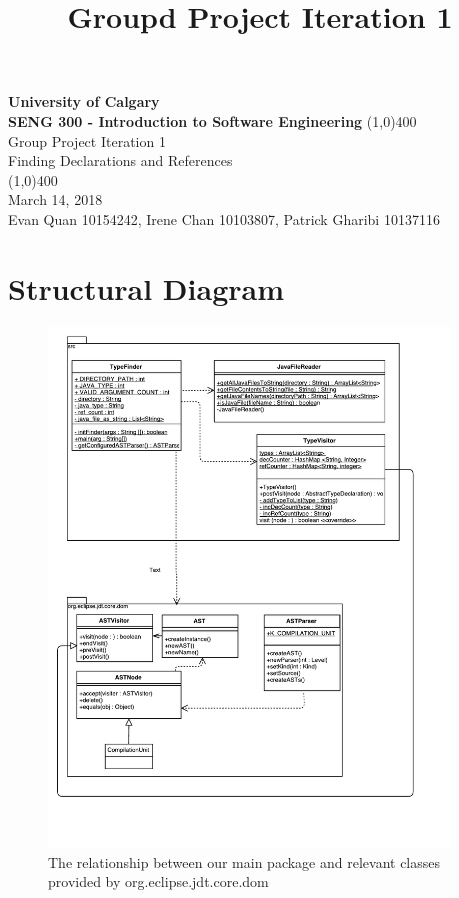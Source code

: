\documentclass[12p]{article}
\title{\vspace{-6ex}Groupd Project Iteration 1}
\date{\vspace{-12ex}}
\begin{document}
\thispagestyle{fancy}

\begin{titlepage}
  \begin{center}
    \vspace{1cm}
    \Large{\textbf{University of Calgary}}\\
    \Large{\textbf{SENG 300  - Introduction to Software Engineering}}
    \vfill
    \line(1,0){400}\\[1mm]
    \huge{Group Project Iteration 1}\\
    \large{Finding Declarations and References}\\
    \line(1,0){400}\\
    \Large March 14, 2018\\
    \vfill
    \large{Evan Quan 10154242, Irene Chan 10103807, Patrick Gharibi 10137116}\\
  \end{center}
\end{titlepage}

%
%

\section{Structural Diagram}
\begin{figure}[H]
  \includegraphics[width=0.95\textwidth]{SengUml.pdf}
  \caption{The relationship between our main package and relevant classes provided by org.eclipse.jdt.core.dom} %
  \label{fig:structural}
\end{figure}
\end{document}
